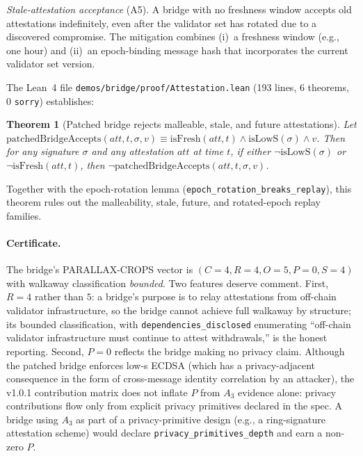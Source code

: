 \documentclass[11pt,a4paper]{article}
\newtheorem{theorem}{Theorem}
\begin{document}
\emph{Stale-attestation acceptance} (A5). A bridge with no freshness window accepts old attestations indefinitely, even after the validator set has rotated due to a discovered compromise. The mitigation combines (i)~a freshness window (e.g., one hour) and (ii)~an epoch-binding message hash that incorporates the current validator set version.

The Lean~4 file \texttt{demos/bridge/proof/Attestation.lean} (193 lines, 6 theorems, 0 \texttt{sorry}) establishes:
\begin{theorem}[Patched bridge rejects malleable, stale, and future attestations]\label{thm:bridge-rejects}
Let $\mathrm{patchedBridgeAccepts}(att, t, \sigma, v) \equiv \mathrm{isFresh}(att, t) \wedge \mathrm{isLowS}(\sigma) \wedge v$. Then for any signature $\sigma$ and any attestation $att$ at time $t$, if either $\neg \mathrm{isLowS}(\sigma)$ or $\neg \mathrm{isFresh}(att, t)$, then $\neg \mathrm{patchedBridgeAccepts}(att, t, \sigma, v)$.
\end{theorem}

\noindent Together with the epoch-rotation lemma (\texttt{epoch\_rotation\_breaks\_replay}), this theorem rules out the malleability, stale, future, and rotated-epoch replay families.

\paragraph{Certificate.} The bridge's PARALLAX-CROPS vector is $(C{=}4, R{=}4, O{=}5, P{=}0, S{=}4)$ with walkaway classification \emph{bounded}. Two features deserve comment. First, $R = 4$ rather than $5$: a bridge's purpose is to relay attestations from off-chain validator infrastructure, so the bridge cannot achieve full walkaway by structure; its bounded classification, with \texttt{dependencies\_disclosed} enumerating ``off-chain validator infrastructure must continue to attest withdrawals,'' is the honest reporting. Second, $P = 0$ reflects the bridge making no privacy claim. Although the patched bridge enforces low-s ECDSA (which has a privacy-adjacent consequence in the form of cross-message identity correlation by an attacker), the v1.0.1 contribution matrix does not inflate $P$ from $A_3$ evidence alone: privacy contributions flow only from explicit privacy primitives declared in the spec. A bridge using $A_3$ as part of a privacy-primitive design (e.g., a ring-signature attestation scheme) would declare \texttt{privacy\_primitives\_depth} and earn a non-zero $P$.
\end{document}
